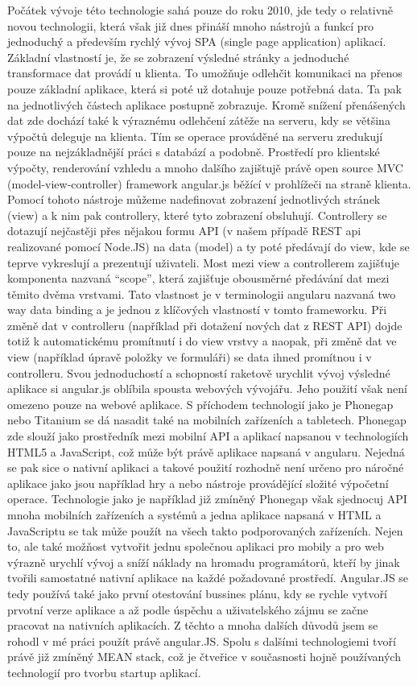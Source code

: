 \documentclass[thesis=M,czech]{FITthesis}[2012/06/26]
\begin{document}
Počátek vývoje této technologie sahá pouze do roku 2010, jde tedy o relativně novou technologii, která však již dnes přináší mnoho nástrojů a funkcí pro jednoduchý a především rychlý vývoj SPA (single page application) aplikací. Základní vlastností je, že se zobrazení výsledné stránky a jednoduché transformace dat provádí u klienta. To umožňuje odlehčit komunikaci na přenos pouze základní aplikace, která si poté už dotahuje pouze potřebná data. Ta pak na jednotlivých částech aplikace postupně zobrazuje. Kromě snížení přenášených dat zde dochází také k výraznému odlehčení zátěže na serveru, kdy se většina výpočtů deleguje na klienta. Tím se operace prováděné na serveru zredukují pouze na nejzákladnější práci s databází a podobně. Prostředí pro klientské výpočty, renderování vzhledu a mnoho dalšího zajištujě právě open source MVC (model-view-controller) framework angular.js běžící v prohlížeči na straně klienta. Pomocí tohoto nástroje můžeme nadefinovat zobrazení jednotlivých stránek (view) a k nim pak controllery, které tyto zobrazení obsluhují. Controllery se dotazují nejčastěji přes nějakou formu API (v našem případě REST api realizované pomocí Node.JS) na data (model) a ty poté předávají do view, kde se teprve vykreslují a prezentují uživateli. Most mezi view a controllerem zajišťuje komponenta nazvaná “scope”, která zajišťuje obousměrné předávání dat mezi těmito dvěma vrstvami. Tato vlastnost je v terminologii angularu nazvaná two way data binding a je jednou z klíčových vlastností v tomto frameworku. Při změně dat v controlleru (například při dotažení nových dat z REST API) dojde totiž k automatickému promítnutí i do view vrstvy a naopak, při změně dat ve view (například úpravě položky ve formuláři) se data ihned promítnou i v controlleru.
Svou jednoduchostí a schopností raketově urychlit vývoj výsledné aplikace si angular.js oblíbila spousta webových vývojářu. Jeho použití však není omezeno pouze na webové aplikace. S příchodem technologií jako je Phonegap nebo Titanium se dá nasadit také na mobilních zařízeních a tabletech. Phonegap zde slouží jako prostředník mezi mobilní API a aplikací napsanou v technologiích HTML5 a JavaScript, což může být právě aplikace napsaná v angularu. Nejedná se pak sice o nativní aplikaci a takové použití rozhodně není určeno pro náročné aplikace jako jsou například hry a nebo nástroje provádějící složité výpočetní operace. Technologie jako je například již zmíněný Phonegap však sjednocuj API mnoha mobilních zařízeních a systémů a jedna aplikace napsaná v HTML a JavaScriptu se tak může použít na všech takto podporovaných zařízeních. Nejen to, ale také možňost vytvořit jednu společnou aplikaci pro mobily a pro web výrazně urychlí vývoj a sníží náklady na hromadu programátorů, kteří by jinak tvořili samostatné nativní aplikace na každé požadované prostředí. Angular.JS se tedy používá také jako první otestování bussines plánu, kdy se rychle vytvoří prvotní verze aplikace a až podle úspěchu a uživatelského zájmu se začne pracovat na nativních aplikacích.
Z těchto a mnoha dalších důvodů jsem se rohodl v mé práci použít právě angular.JS. Spolu s dalšími technologiemi tvoří právě již zmíněný MEAN stack, což je čtveřice v současnosti hojně používaných technologií pro tvorbu startup aplikací.
\end{document}
